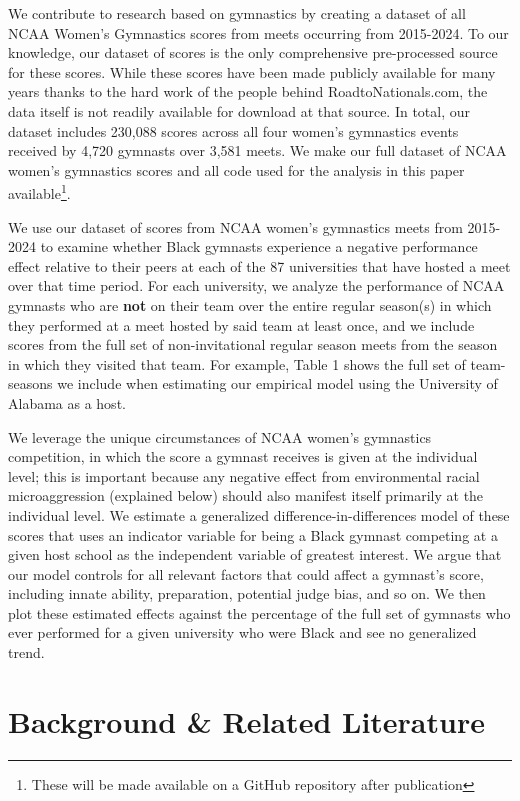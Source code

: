 \documentclass[12pt]{article}
\begin{document}
We contribute to research based on gymnastics by creating a dataset of all NCAA Women's Gymnastics scores from meets occurring from 2015-2024. To our knowledge, our dataset of scores is the only comprehensive pre-processed source for these scores. While these scores have been made publicly available for many years thanks to the hard work of the people behind RoadtoNationals.com, the data itself is not readily available for download at that source. In total, our dataset includes 230,088 scores across all four women’s gymnastics events received by 4,720 gymnasts over 3,581 meets. We make our full dataset of NCAA women's gymnastics scores and all code used for the analysis in this paper available\footnote{These will be made available on a GitHub repository after publication}.

We use our dataset of scores from NCAA women's gymnastics meets from 2015-2024 to examine whether Black gymnasts experience a negative performance effect relative to their peers at each of the 87 universities that have hosted a meet over that time period. For each university, we analyze the performance of NCAA gymnasts who are \textbf{not} on their team over the entire regular season(s) in which they performed at a meet hosted by said team at least once, and we include scores from the full set of non-invitational regular season meets from the season in which they visited that team. For example, Table 1 shows the full set of team-seasons we include when estimating our empirical model using the University of Alabama as a host. 

We leverage the unique circumstances of NCAA women's gymnastics competition, in which the score a gymnast receives is given at the individual level; this is important because any negative effect from environmental racial microaggression (explained below) should also manifest itself primarily at the individual level. We estimate a generalized difference-in-differences model of these scores that uses an indicator variable for being a Black gymnast competing at a given host school as the independent variable of greatest interest. We argue that our model controls for all relevant factors that could affect a gymnast’s score, including innate ability, preparation, potential judge bias, and so on. We then plot these estimated effects against the percentage of the full set of gymnasts who ever performed for a given university who were Black and see no generalized trend.


\section{Background {\&} Related Literature}
\end{document}
